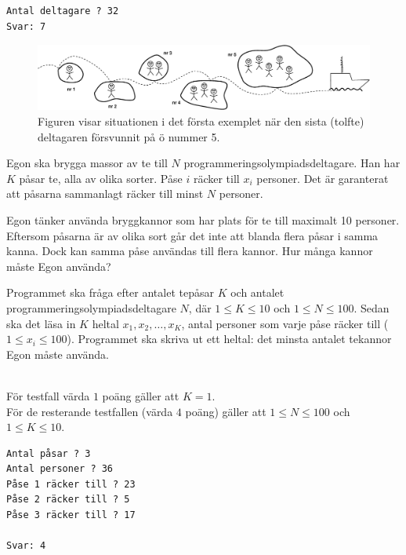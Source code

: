 
\begin{verbatim}
Antal deltagare ? 32
Svar: 7
\end{verbatim}

\vspace{1cm}
\begin{figure}[!h]
  \centering
      \includegraphics[width=1.0\textwidth]{oarfig.eps}
      \caption{Figuren visar situationen i det första exemplet när den sista (tolfte) deltagaren försvunnit på ö nummer 5.}
\end{figure}

\newpage
{}

Egon ska brygga massor av te till $N$ programmeringsolympiadsdeltagare.
Han har $K$ påsar te, alla av olika sorter.
Påse $i$ räcker till $x_i$ personer. Det är garanterat att påsarna sammanlagt räcker till minst $N$ personer.

Egon tänker använda bryggkannor som har plats för te till maximalt 10 personer.
Eftersom påsarna är av olika sort
går det inte att blanda flera påsar i samma kanna.
Dock kan samma påse användas till flera kannor. Hur många kannor måste Egon använda?

Programmet ska fråga efter antalet tepåsar $K$ och antalet programmeringsolympiadsdeltagare $N$, där $1 \le K \le 10$ och $1 \le N \le 100$. 
Sedan ska det läsa in $K$ heltal $x_1, x_2, \dots, x_K$, antal personer som varje påse räcker till ($1 \le x_i \le 100$). Programmet ska skriva ut ett heltal: det minsta antalet tekannor Egon måste använda. 

\\
För testfall värda $1$ poäng gäller att $K=1$. \\
För de resterande testfallen (värda $4$ poäng) gäller att $1\leq N\leq 100$ och $1\leq K\leq 10$.

\begin{verbatim}
Antal påsar ? 3
Antal personer ? 36
Påse 1 räcker till ? 23
Påse 2 räcker till ? 5
Påse 3 räcker till ? 17

Svar: 4
\end{verbatim}


